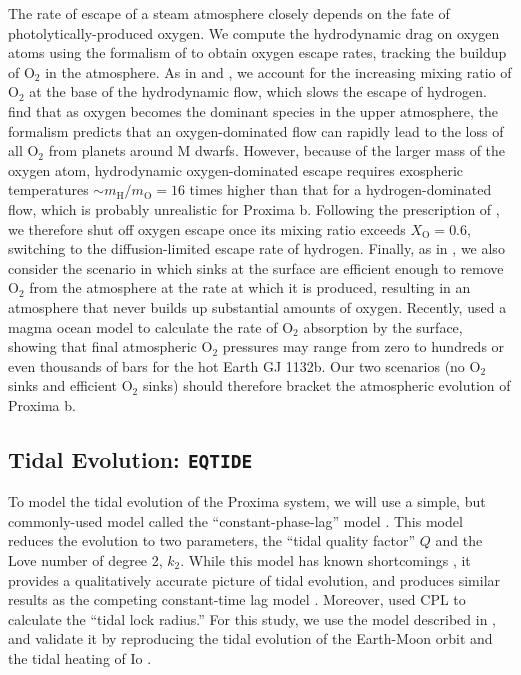\documentclass[preprint,12pt]{aastex}
\def\eqtide{\texttt{\footnotesize{EQTIDE}}\xspace}
\begin{document}
The rate of escape of a steam atmosphere closely depends on the fate
of photolytically-produced oxygen. We compute the hydrodynamic drag on
oxygen atoms using the formalism of \cite{Hunten87} to obtain oxygen
escape rates, tracking the buildup of O$_2$ in the atmosphere. As in
\cite{Tian15} and \cite{Schaefer16}, we account for the increasing
mixing ratio of O$_2$ at the base of the hydrodynamic flow, which
slows the escape of hydrogen. \cite{Tian15} find that as oxygen
becomes the dominant species in the upper atmosphere, the
\cite{Hunten87} formalism predicts that an oxygen-dominated flow can
rapidly lead to the loss of all O$_2$ from planets around M
dwarfs. However, because of the larger mass of the oxygen atom,
hydrodynamic oxygen-dominated escape requires exospheric temperatures
$\sim m_\mathrm{H}/m_\mathrm{O} = 16$ times higher than that for a
hydrogen-dominated flow, which is probably unrealistic for Proxima
b. Following the prescription of \cite{Schaefer16}, we therefore
shut off oxygen escape once its mixing ratio exceeds $X_\mathrm{O} =
0.6$, switching to the diffusion-limited escape rate of
hydrogen. Finally, as in \cite{LugerBarnes15}, we also consider the
scenario in which sinks at the surface are efficient enough to remove
O$_2$ from the atmosphere at the rate at which it is produced,
resulting in an atmosphere that never builds up substantial amounts of
oxygen. Recently, \cite{Schaefer16} used a magma ocean model to
calculate the rate of O$_2$ absorption by the surface, showing that
final atmospheric O$_2$ pressures may range from zero to hundreds or
even thousands of bars for the hot Earth GJ 1132b. Our two scenarios
(no O$_2$ sinks and efficient O$_2$ sinks) should therefore bracket
the atmospheric evolution of Proxima b.

\subsection{Tidal Evolution: \eqtide}
\label{sec:models:eqtide}
To model the tidal evolution of the Proxima system, we will use a
simple, but commonly-used model called the ``constant-phase-lag''
model \citep{Goldreich66,Greenberg09,Heller11}. This model reduces the
evolution to two parameters, the ``tidal quality factor'' $Q$ and the
Love number of degree 2, $k_2$. While this model has known
shortcomings \citep{ToumaWisdom94,EfroimskyMakarov13}, it provides a
qualitatively accurate picture of tidal evolution, and produces
similar results as the competing constant-time lag model
\citep{Heller10,Barnes13,Barnes16}. Moreover, \cite{Kasting93} used
CPL to calculate the ``tidal lock radius.'' For this study, we use the
model described in \cite{Heller11}, and validate it by reproducing the
tidal evolution of the Earth-Moon orbit \citep{MacDonald64} and the
tidal heating of Io \citep{Peale79}.
\end{document}
